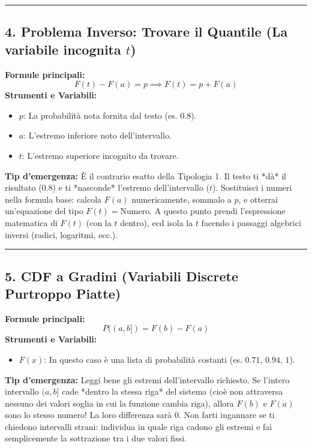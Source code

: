 \documentclass[12pt, a4paper]{article}
\begin{document}
\vspace{0.3cm}\hrule\vspace{0.3cm}

\subsection*{4. Problema Inverso: Trovare il Quantile (La variabile incognita $t$)}
\textbf{Formule principali:}
$$F(t)-F(a)=p \implies F(t)=p+F(a)$$
\textbf{Strumenti e Variabili:}
\begin{itemize}
    \item $p$: La probabilità nota fornita dal testo (es. $0.8$).
    \item $a$: L'estremo inferiore noto dell'intervallo.
    \item $t$: L'estremo superiore incognito da trovare.
\end{itemize}
\textbf{Tip d'emergenza:} È il contrario esatto della Tipologia 1. Il testo ti *dà* il risultato ($0.8$) e ti *nasconde* l'estremo dell'intervallo ($t$). Sostituisci i numeri nella formula base: calcola $F(a)$ numericamente, sommalo a $p$, e otterrai un'equazione del tipo $F(t) = \text{Numero}$. A questo punto prendi l'espressione matematica di $F(t)$ (con la $t$ dentro), ecd isola la $t$ facendo i passaggi algebrici inversi (radici, logaritmi, ecc.).

\vspace{0.3cm}\hrule\vspace{0.3cm}

\subsection*{5. CDF a Gradini (Variabili Discrete Purtroppo Piatte)}
\textbf{Formule principali:}
$$P((a,b])=F(b)-F(a)$$
\textbf{Strumenti e Variabili:}
\begin{itemize}
    \item $F(x)$: In questo caso è una lista di probabilità costanti (es. $0.71$, $0.94$, $1$).
\end{itemize}
\textbf{Tip d'emergenza:} Leggi bene gli estremi dell'intervallo richiesto. Se l'intero intervallo $(a, b]$ cade *dentro la stessa riga* del sistema (cioè non attraversa nessuno dei valori soglia in cui la funzione cambia riga), allora $F(b)$ e $F(a)$ sono lo stesso numero! La loro differenza sarà $0$. Non farti ingannare se ti chiedono intervalli strani: individua in quale riga cadono gli estremi e fai semplicemente la sottrazione tra i due valori fissi.
\end{document}
